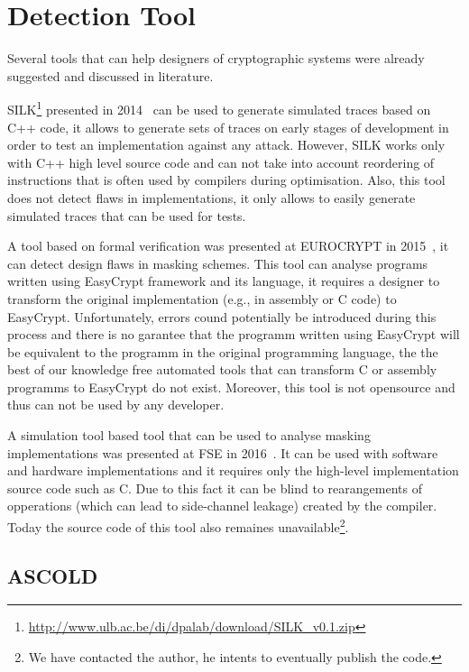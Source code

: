\section{Detection Tool}\label{sec:tool}

Several tools that can help designers of cryptographic systems
were already suggested and discussed in literature.

SILK\footnote{\url{http://www.ulb.ac.be/di/dpalab/download/SILK_v0.1.zip}} 
presented in 2014~\cite{DBLP:conf/acsac/Veshchikov14}
can be used to generate simulated traces based on C++ code, it allows
to generate sets of traces on early stages of development in order to test an implementation
against any attack. However, SILK works only with C++ high level source code and 
can not take into account reordering of instructions that is often used by compilers during
optimisation. Also, this tool does not detect flaws in implementations, 
it only allows to easily generate simulated traces that can be used for tests.

A tool based on formal verification 
was presented at EUROCRYPT in 2015~\cite{DBLP:conf/eurocrypt/BartheBDFGS15},
it can detect design flaws in masking schemes.
This tool can analyse programs written using EasyCrypt framework and its language,
it requires a designer to transform the original implementation (e.g., in assembly or C code)
to EasyCrypt. Unfortunately, errors cound potentially be introduced during this process
and there is no garantee that the programm written using EasyCrypt will be equivalent
to the programm in the original programming language, the the best of our knowledge
free automated tools that can transform C or assembly programms to EasyCrypt do not exist.
Moreover, this tool is not opensource and thus can not be used by any developer.

A simulation tool based tool that can be used to analyse masking implementations
was presented at FSE in 2016~\cite{DBLP:conf/fse/Reparaz16}.
It can be used with software and hardware implementations
and it requires only the high-level implementation source code such as C.
Due to this fact it can be blind to rearangements of opperations 
(which can lead to side-channel leakage) created by the compiler.
Today the source code of this tool also remaines 
unavailable\footnote{We have contacted the author, he intents to eventually publish the code.}.

\subsection{ASCOLD}\label{subsec:ascold}

